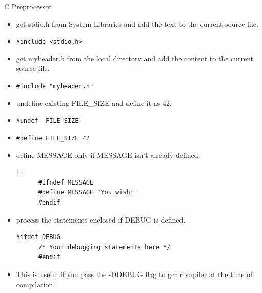 \documentclass[10pt,t]{beamer}
\begin{document}
\begin{frame}{C Preprocessor}
\begin{itemize}
  \item get stdio.h from System Libraries and add the text to the current source file.
  \item[] \lstinline[basicstyle=\scriptsize\ttfamily]|#include <stdio.h>|
  \item get myheader.h from the local directory and add the content to the current source file.
  \item[] \lstinline[basicstyle=\scriptsize\ttfamily]|#include "myheader.h"|
  \item undefine existing FILE\_SIZE and define it as 42.
  \item[] \lstinline[basicstyle=\scriptsize\ttfamily]|#undef  FILE_SIZE|
  \item[] \lstinline[basicstyle=\scriptsize\ttfamily]|#define FILE_SIZE 42|
  \item define MESSAGE only if MESSAGE isn't already defined.
    \begin{lstlisting}[basicstyle=\scriptsize\ttfamily]||
      #ifndef MESSAGE
      #define MESSAGE "You wish!"
      #endif
    \end{lstlisting}
  \item process the statements enclosed if DEBUG is defined.
    \begin{lstlisting}[basicstyle=\scriptsize\ttfamily]
      #ifdef DEBUG
      /* Your debugging statements here */
      #endif
    \end{lstlisting}
  \item This is useful if you pass the -DDEBUG flag to gcc compiler at the time of compilation.    
  \end{itemize}
\end{frame}


\end{document}
